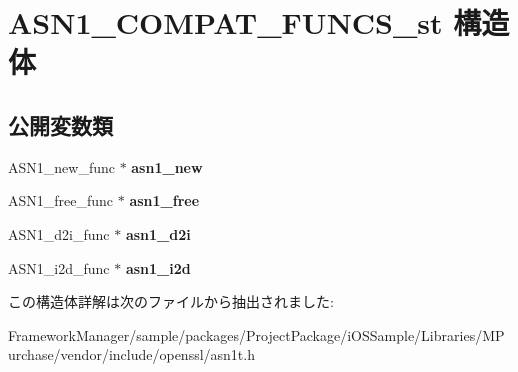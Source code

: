 \hypertarget{struct_a_s_n1___c_o_m_p_a_t___f_u_n_c_s__st}{}\section{A\+S\+N1\+\_\+\+C\+O\+M\+P\+A\+T\+\_\+\+F\+U\+N\+C\+S\+\_\+st 構造体}
\label{struct_a_s_n1___c_o_m_p_a_t___f_u_n_c_s__st}
\subsection*{公開変数類}
\begin{DoxyCompactItemize}
\item 
\hypertarget{struct_a_s_n1___c_o_m_p_a_t___f_u_n_c_s__st_a94f635811e78f33d0fe04c596dbfc11e}{}A\+S\+N1\+\_\+new\+\_\+func $\ast$ {\bfseries asn1\+\_\+new}\label{struct_a_s_n1___c_o_m_p_a_t___f_u_n_c_s__st_a94f635811e78f33d0fe04c596dbfc11e}

\item 
\hypertarget{struct_a_s_n1___c_o_m_p_a_t___f_u_n_c_s__st_adc6f726c319ead22c5b6c3aee130b8df}{}A\+S\+N1\+\_\+free\+\_\+func $\ast$ {\bfseries asn1\+\_\+free}\label{struct_a_s_n1___c_o_m_p_a_t___f_u_n_c_s__st_adc6f726c319ead22c5b6c3aee130b8df}

\item 
\hypertarget{struct_a_s_n1___c_o_m_p_a_t___f_u_n_c_s__st_aeddb5865fc5b6642fc062d737a032b2b}{}A\+S\+N1\+\_\+d2i\+\_\+func $\ast$ {\bfseries asn1\+\_\+d2i}\label{struct_a_s_n1___c_o_m_p_a_t___f_u_n_c_s__st_aeddb5865fc5b6642fc062d737a032b2b}

\item 
\hypertarget{struct_a_s_n1___c_o_m_p_a_t___f_u_n_c_s__st_a0cc66997a2839cd692302f0cc1ffbb56}{}A\+S\+N1\+\_\+i2d\+\_\+func $\ast$ {\bfseries asn1\+\_\+i2d}\label{struct_a_s_n1___c_o_m_p_a_t___f_u_n_c_s__st_a0cc66997a2839cd692302f0cc1ffbb56}

\end{DoxyCompactItemize}


この構造体詳解は次のファイルから抽出されました\+:\begin{DoxyCompactItemize}
\item 
Framework\+Manager/sample/packages/\+Project\+Package/i\+O\+S\+Sample/\+Libraries/\+M\+Purchase/vendor/include/openssl/asn1t.\+h\end{DoxyCompactItemize}
